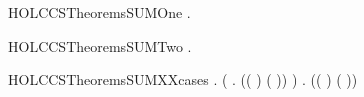\newcommand{\HOLCCSTheoremsRESTRXXNILXXNOXXTRANS}{\UseVerbatim{HOLCCSTheoremsRESTRXXNILXXNOXXTRANS}}
\begin{SaveVerbatim}{HOLCCSTheoremsSUMOne}
\HOLTokenTurnstile{} \HOLSymConst{\HOLTokenForall{}}   .  \HOLTokenTransBegin{}\HOLTokenTransEnd {} \HOLSymConst{\HOLTokenImp{}}  \HOLSymConst{+}  \HOLTokenTransBegin{}\HOLTokenTransEnd {}
\end{SaveVerbatim}
\newcommand{\HOLCCSTheoremsSUMOne}{\UseVerbatim{HOLCCSTheoremsSUMOne}}
\begin{SaveVerbatim}{HOLCCSTheoremsSUMTwo}
\HOLTokenTurnstile{} \HOLSymConst{\HOLTokenForall{}}   .  \HOLTokenTransBegin{}\HOLTokenTransEnd {} \HOLSymConst{\HOLTokenImp{}}  \HOLSymConst{+}  \HOLTokenTransBegin{}\HOLTokenTransEnd {}
\end{SaveVerbatim}
\newcommand{\HOLCCSTheoremsSUMTwo}{\UseVerbatim{HOLCCSTheoremsSUMTwo}}
\begin{SaveVerbatim}{HOLCCSTheoremsSUMXXcases}
\HOLTokenTurnstile{} \HOLSymConst{\HOLTokenForall{}}   .
        \HOLSymConst{+}  \HOLTokenTransBegin{}\HOLTokenTransEnd {} \HOLSymConst{\HOLTokenImp{}}
       (\HOLSymConst{\HOLTokenExists{}} . (( \HOLSymConst{=} ) \HOLSymConst{\HOLTokenConj{}} ( \HOLSymConst{=} )) \HOLSymConst{\HOLTokenConj{}}  \HOLTokenTransBegin{}\HOLTokenTransEnd {}) \HOLSymConst{\HOLTokenDisj{}}
       \HOLSymConst{\HOLTokenExists{}} . (( \HOLSymConst{=} ) \HOLSymConst{\HOLTokenConj{}} ( \HOLSymConst{=} )) \HOLSymConst{\HOLTokenConj{}}  \HOLTokenTransBegin{}\HOLTokenTransEnd {}
\end{SaveVerbatim}
\newcommand{\HOLCCSTheoremsSUMXXcases}{\UseVerbatim{HOLCCSTheoremsSUMXXcases}}
